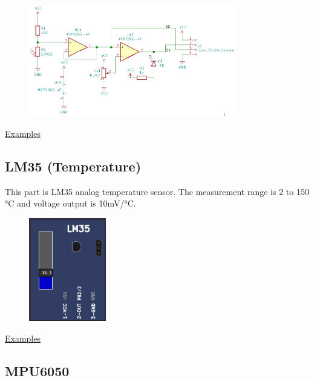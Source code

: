\begin{figure}[H]
\center
\includegraphics[width=0.8\textwidth]{img/part_LDR_.png} 
\end{figure} 


\href{https://lcgamboa.github.io/picsimlab_examples/parts_LDR.html}{Examples}

\vspace{0.5cm}


\subsection{LM35 (Temperature)}

This part is LM35 analog temperature sensor. The measurement range is 2 to 150 °C  and 
voltage output is 10mV/°C.

\begin{figure}[H]
\center
\includegraphics[width=0.3\textwidth]{img/part_lm35.png} 
\end{figure} 


\href{https://lcgamboa.github.io/picsimlab_examples/parts_LM35_(Temperature).html}{Examples}

\vspace{0.5cm}


\subsection{MPU6050}

